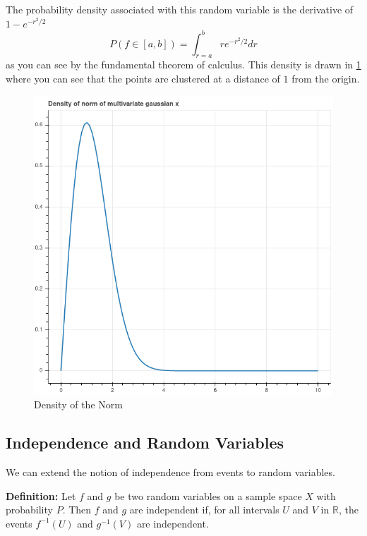 \documentclass[
  oneside]{scrbook}
\begin{document}
The probability density associated with this random variable is the
derivative of \(1-e^{-r^2/2}\) \[
P(f\in [a,b])=\int_{r=a}^{b} re^{-r^2/2} dr
\] as you can see by the fundamental theorem of calculus. This density
is drawn in \cref{fig:maxwell} where you can see that the points are
clustered at a distance of \(1\) from the origin.

\begin{figure}
\hypertarget{fig:maxwell}{%
\centering
\includegraphics{img/maxwell.png}
\caption{Density of the Norm}\label{fig:maxwell}
}
\end{figure}

\hypertarget{independence-and-random-variables}{%
\subsection{Independence and Random
Variables}\label{independence-and-random-variables}}

We can extend the notion of independence from events to random
variables.

\textbf{Definition:} Let \(f\) and \(g\) be two random variables on a
sample space \(X\) with probability \(P\). Then \(f\) and \(g\) are
independent if, for all intervals \(U\) and \(V\) in \(\mathbb{R}\), the
events \(f^{-1}(U)\) and \(g^{-1}(V)\) are independent.
\end{document}
